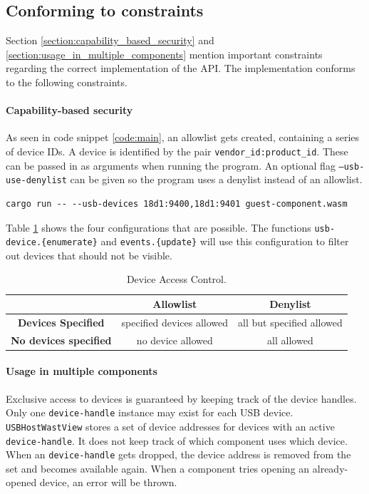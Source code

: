 \subsection{Conforming to constraints}
Section \ref{section:capability_based_security} and \ref{section:usage_in_multiple_components} mention important constraints regarding the correct implementation of the API. The implementation conforms to the following constraints.

\paragraph{Capability-based security}
As seen in code snippet \ref{code:main}, an allowlist gets created, containing a series of device IDs. A device is identified by the pair \texttt{vendor\_id:product\_id}. These can be passed in as arguments when running the program. An optional flag \texttt{--usb-use-denylist} can be given so the program uses a denylist instead of an allowlist.

\begin{verbatim}
cargo run -- --usb-devices 18d1:9400,18d1:9401 guest-component.wasm
\end{verbatim}

Table \ref{table:allowlist} shows the four configurations that are possible. The functions \texttt{usb-device.\{enumerate\}} and \texttt{events.\{update\}} will use this configuration to filter out devices that should not be visible.

\begin{table}[h!]
\centering
\begin{tabular}{|c|c|c|}
\hline
& \textbf{Allowlist} & \textbf{Denylist} \\
\hline
\textbf{Devices Specified} & specified devices allowed & all but specified allowed \\
\hline
\textbf{No devices specified} & no device allowed & all allowed \\
\hline
\end{tabular}
\caption{Device Access Control.}
\label{table:allowlist}
\end{table}

\paragraph{Usage in multiple components} Exclusive access to devices is guaranteed by keeping track of the device handles. Only one \texttt{device-handle} instance may exist for each \acrshort{USB} device. \texttt{USBHostWastView} stores a set of device addresses for devices with an active \texttt{device-handle}. It does not keep track of which component uses which device. When an \texttt{device-handle} gets dropped, the device address is removed from the set and becomes available again. When a component tries opening an already-opened device, an error will be thrown. 

